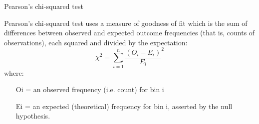 Pearson's chi-squared test

Pearson's chi-squared test uses a measure of goodness of fit which is the sum of differences between observed and expected outcome frequencies (that is, counts of observations), each squared and divided by the expectation:
\[ \chi^2 = \sum_{i=1}^n {\frac{(O_i - E_i)}{E_i}^2} \]
where:

\begin{itemize}
\item[Oi] = an observed frequency (i.e. count) for bin i
\item[Ei] = an expected (theoretical) frequency for bin i, asserted by the null hypothesis.
\end{itemize}
